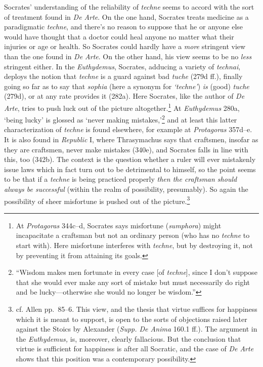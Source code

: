﻿\documentclass[11pt]{amsart}
\begin{document}
Socrates' understanding of the reliability of \emph{techne} seems to accord with the sort of treatment found in \emph{De Arte}. On the one hand, Socrates treats medicine as a paradigmatic \emph{techne}, and there's no reason to suppose that he or anyone else would have thought that a doctor could heal anyone no matter what their injuries or age or health. So Socrates could hardly have a \emph{more} stringent view than the one found in \emph{De Arte}. On the other hand, his view seems to be no \emph{less} stringent either. In the \emph{Euthydemus}, Socrates, adducing a variety of \emph{technai}, deploys the notion that \emph{techne} is a guard against bad \emph{tuche} (279d ff.), finally going so far as to say that \emph{sophia} (here a synonym for \emph{`techne'}) \emph{is} (good) \emph{tuche} (279d), or at any rate provides it (282a). Here Socrates, like the author of \emph{De Arte}, tries to push luck out of the picture altogether.\footnote{At \emph{Protagoras} 344c--d, Socrates says misfortune (\emph{sumphora}) might incapacitate a craftsman but not an ordinary person (who has no \emph{techne} to start with). Here misfortune interferes with \emph{techne}, but by destroying it, not by preventing it from attaining its goals.} At \emph{Euthydemus} 280a, `being lucky' is glossed as `never making mistakes,'\footnote{``Wisdom makes men fortunate in every case [of \emph{techne}], since I don't suppose that she would ever make any sort of mistake but must necessarily do right and be lucky---otherwise she would no longer be wisdom.''} and at least this latter characterization of \emph{techne} is found elsewhere, for example at \emph{Protagoras} 357d--e. It is also found in \emph{Republic} I, where Thrasymachus says that craftsmen, insofar as they are craftsmen, never make mistakes (340e), and Socrates falls in line with this, too (342b). The context is the question whether a ruler will ever mistakenly issue laws which in fact turn out to be detrimental to himself, so the point seems to be that if a \emph{techne} is being practiced properly \emph{then the craftsman should always be successful} (within the realm of possibility, presumably). So again the possibility of sheer misfortune is pushed out of the picture.\footnote{cf. Allen pp.~85--6. This view, and the thesis that virtue suffices for happiness which it is meant to support, is open to the sorts of objections raised later against the Stoics by Alexander (\emph{Supp. De Anima} 160.1 ff.). The argument in the \emph{Euthydemus,} is, moreover, clearly fallacious. But the conclusion that virtue is sufficient for happiness is after all Socratic, and the case of \emph{De Arte} shows that this position was a contemporary possibility.}
\end{document}

